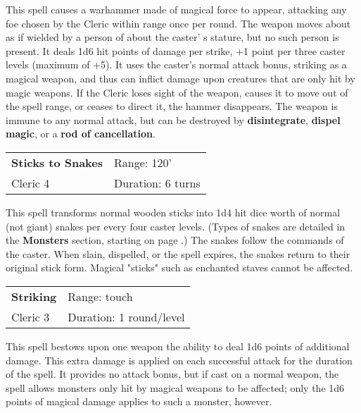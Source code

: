 \documentclass[a4paper,twoside,openany,10pt]{book}
\begin{document}
\begin{multicols}{2}
This spell causes a warhammer made of magical force to appear, attacking any foe chosen by the Cleric within range once per round. The weapon moves about as if wielded by a person of about the caster' s stature, but no such person is present. It deals 1d6 hit points of damage per strike, +1 point per three caster levels (maximum of +5). It uses the caster's normal attack bonus, striking as a magical weapon, and thus can inflict damage upon creatures that are only hit by magic weapons. If the Cleric loses sight of the weapon, causes it to move out of the spell range, or ceases to direct it, the hammer disappears. The weapon is immune to any normal attack, but can be destroyed by \textbf{disintegrate}, \textbf{dispel magic}, or a \textbf{rod of cancellation}.

\smallskip\begin{flushleft} 
	\begin{tabularx}{0.45\textwidth}{@{}m{3.5cm}m{5.5cm}@{}} 
		\textbf{Sticks to Snakes} & Range: 120'\\
Cleric 4 & Duration: 6 turns\\
	\end{tabularx}\end{flushleft}

This spell transforms normal wooden sticks into 1d4 hit dice worth of normal (not giant) snakes per every four caster levels. (Types of snakes are detailed in the \textbf{Monsters} section, starting on page \hyperlink{snake-pit-viper-and-rattlesnake}{\pageref{snake-pit-viper-and-rattlesnake}}.) The snakes follow the commands of the caster. When slain, dispelled, or the spell expires, the snakes return to their original stick form. Magical "sticks" such as enchanted staves cannot be affected.

\smallskip\begin{flushleft} 
	\begin{tabularx}{0.45\textwidth}{@{}m{3.5cm}m{5.5cm}@{}} 
		\textbf{Striking} & Range: touch\\
		Cleric 3 & Duration: 1 round/level\\
	\end{tabularx}\end{flushleft}

This spell bestows upon one weapon the ability to deal 1d6 points of additional damage. This extra damage is applied on each successful attack for the duration of the spell. It provides no attack bonus, but if cast on a normal weapon, the spell allows monsters only hit by magical weapons to be affected; only the 1d6 points of magical damage applies to such a monster, however.


\end{multicols}
\end{document}

